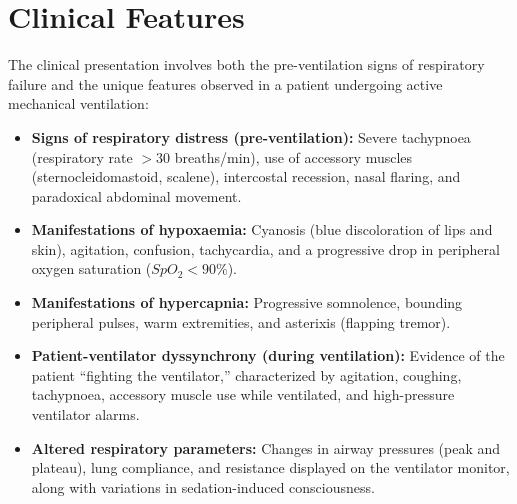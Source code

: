\section*{Clinical Features}
The clinical presentation involves both the pre-ventilation signs of respiratory failure and the unique features observed in a patient undergoing active mechanical ventilation:
\begin{itemize}
    \item \textbf{Signs of respiratory distress (pre-ventilation):} Severe tachypnoea (respiratory rate $>30$ breaths/min), use of accessory muscles (sternocleidomastoid, scalene), intercostal recession, nasal flaring, and paradoxical abdominal movement.
    \item \textbf{Manifestations of hypoxaemia:} Cyanosis (blue discoloration of lips and skin), agitation, confusion, tachycardia, and a progressive drop in peripheral oxygen saturation ($SpO_2 <90\%$).
    \item \textbf{Manifestations of hypercapnia:} Progressive somnolence, bounding peripheral pulses, warm extremities, and asterixis (flapping tremor).
    \item \textbf{Patient-ventilator dyssynchrony (during ventilation):} Evidence of the patient ``fighting the ventilator,'' characterized by agitation, coughing, tachypnoea, accessory muscle use while ventilated, and high-pressure ventilator alarms.
    \item \textbf{Altered respiratory parameters:} Changes in airway pressures (peak and plateau), lung compliance, and resistance displayed on the ventilator monitor, along with variations in sedation-induced consciousness.
\end{itemize}

